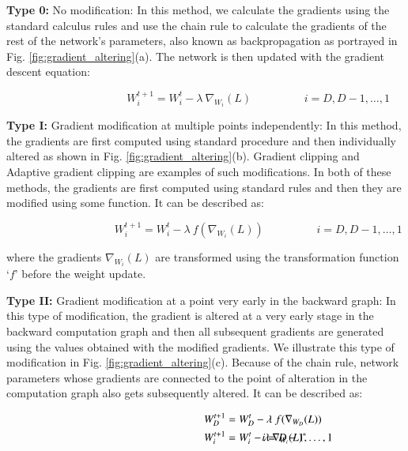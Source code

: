 \documentclass[times,sort&compress]{elsarticle}
\begin{document}
\textbf{Type 0:} No modification: In this method, we calculate the gradients using the
standard calculus rules and use the chain rule to calculate the gradients of the rest of
the network's parameters, also known as backpropagation as portrayed in Fig.
\ref{fig:gradient_altering}(a). The network is then updated with the gradient descent
equation:

\begin{equation}
\hspace{4cm}
W_i^{t+1} = W_i^t - \lambda\ \nabla_{W_i}(L)
\hspace{2cm}
i=D,D-1,\ldots,1
\end{equation}

\textbf{Type I:} Gradient modification at multiple points independently: In this method,
the gradients are first computed using standard procedure and then individually altered
as shown in Fig. \ref{fig:gradient_altering}(b). Gradient clipping
\cite{pascanu2013difficulty} and Adaptive gradient clipping \cite{brock2021high} are
examples of such modifications. In both of these methods, the gradients are first
computed using standard rules and then they are modified using some function. It can be
described as:

\begin{equation}
\hspace{4cm}
W_i^{t+1} = W_i^t - \lambda\ f(\nabla_{W_i}(L))
\hspace{2cm}
i=D,D-1,\ldots,1
\end{equation}

where the gradients $\nabla_{W_i}(L)$ are transformed using the transformation function
`$f$' before the weight update.

\textbf{Type II:} Gradient modification at a point very early in the backward graph: In
this type of modification, the gradient is altered at a very early stage in the backward
computation graph and then all subsequent gradients are generated using the values
obtained with the modified gradients. We illustrate this type of modification in Fig.
\ref{fig:gradient_altering}(c). Because of the chain rule, network parameters whose
gradients are connected to the point of alteration in the computation graph also gets
subsequently altered. It can be described as:

\begin{align}
\hspace{4cm}
W_D^{t+1} &= W_D^t - \lambda\ f(\nabla_{W_D}(L)) & \\
W_i^{t+1} &= W_i^t - \lambda\ \nabla_{W_i}(L)^{*} &\hspace{-3cm} i=D-1,\ldots,1
\end{align}
\end{document}
